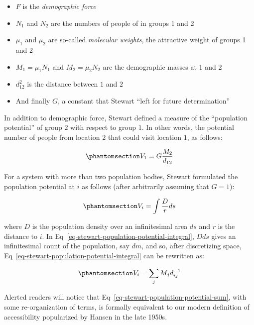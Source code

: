 \documentclass[
  10pt,
  letterpaper,
]{article}
\providecommand{\tightlist}{%
  \setlength{\itemsep}{0pt}\setlength{\parskip}{0pt}}\usepackage{longtable,booktabs,array}
\begin{document}
\begin{itemize}
\tightlist
\item
  \(F\) is the \emph{demographic force}
\item
  \(N_1\) and \(N_2\) are the numbers of people of in groups 1 and 2
\item
  \(\mu_1\) and \(\mu_2\) are so-called \emph{molecular weights}, the
  attractive weight of groups 1 and 2
\item
  \(M_1 = \mu_1N_1\) and \(M_2 = \mu_2N_2\) are the demographic masses
  at 1 and 2
\item
  \(d_{12}^2\) is the distance between \(1\) and \(2\)
\item
  And finally \(G\), a constant that Stewart ``left for future
  determination''
  \citep[p.~34]{stewartDemographicGravitationEvidence1948}
\end{itemize}

In addition to demographic force, Stewart defined a measure of the
``population potential'' of group \(2\) with respect to group \(1\). In
other words, the potential number of people from location \(2\) that
could visit location \(1\), as follows:

\begin{equation}\phantomsection\label{eq-stewart-population-potential}{
V_1 = G\frac{M_2}{d_{12}}
}\end{equation}

For a system with more than two population bodies, Stewart formulated
the population potential at \(i\) as follows (after arbitrarily assuming
that \(G=1\)):

\begin{equation}\phantomsection\label{eq-stewart-population-potential-integral}{
V_i = \int\frac{D}{r} ds
}\end{equation}

\noindent where \(D\) is the population density over an infinitesimal
area \(ds\) and \(r\) is the distance to \(i\). In
Eq~\ref{eq-stewart-population-potential-integral}, \(D ds\) gives an
infinitesimal count of the population, say \(dm\), and so, after
discretizing space, Eq~\ref{eq-stewart-population-potential-integral}
can be rewritten as:

\begin{equation}\phantomsection\label{eq-stewart-population-potential-sum}{
V_i = \sum_j M_jd_{ij}^{-1}
}\end{equation}

Alerted readers will notice that
Eq~\ref{eq-stewart-population-potential-sum}, with some re-organization
of terms, is formally equivalent to our modern definition of
accessibility popularized by Hansen \citep{hansen1959} in the late
1950s.
\end{document}

